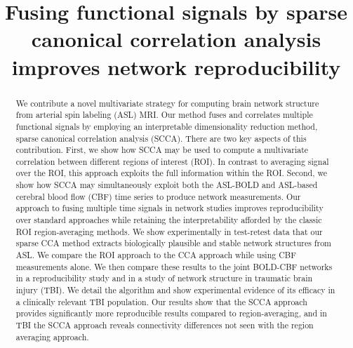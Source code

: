 \documentclass{llncs}
\title{Fusing functional signals by sparse canonical correlation analysis improves network reproducibility}
\begin{document}
\maketitle
\begin{abstract}
We contribute a novel multivariate strategy for computing brain network structure from arterial spin labeling (ASL) MRI.  Our method fuses and correlates multiple functional signals by employing an interpretable dimensionality reduction method, sparse canonical correlation analysis (SCCA).  There are two key aspects of this contribution.  First, we show how SCCA may be used to compute a multivariate correlation between different regions of interest (ROI).  In contrast to averaging signal over the ROI, this approach exploits the full information within the ROI.  Second, we show how SCCA may simultaneously exploit both the ASL-BOLD and ASL-based cerebral blood flow (CBF) time series to produce network measurements.  Our approach to fusing multiple time signals in network studies improves reproducibility over standard approaches while retaining the interpretability afforded by the classic ROI region-averaging methods.  We show experimentally in test-retest data that our sparse CCA method extracts biologically plausible and stable network structures from ASL.  We compare the ROI approach to the CCA approach while using CBF measurements alone.  We then compare these results to the joint BOLD-CBF networks in a reproducibility study and in a study of network structure in traumatic brain injury (TBI).  We detail the algorithm and show experimental evidence of its efficacy in a clinically relevant TBI population.  Our results show that the SCCA approach provides significantly more reproducible results compared to region-averaging, and in TBI the SCCA approach reveals connectivity differences not seen with the region averaging approach.
\end{abstract}
\end{document}
